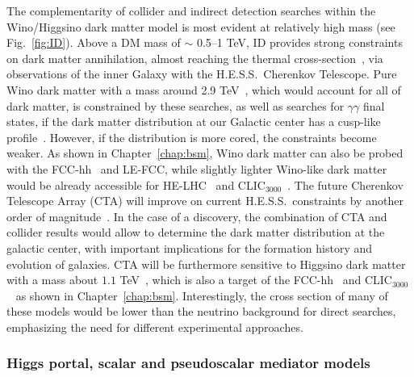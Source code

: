 \documentclass[../report.tex]{subfiles}
\begin{document}
The complementarity of collider and indirect detection searches within the Wino/Higgsino dark matter model is most evident at relatively high mass (see Fig.~\ref{fig:ID}). Above a DM mass of $\sim$ 0.5--1 TeV, ID provides strong constraints on dark matter annihilation, almost reaching the thermal cross-section~\cite{Abdallah:2016ygi}, via observations of the inner Galaxy with the H.E.S.S.~Cherenkov Telescope. Pure Wino dark matter with a mass around 2.9 TeV~\cite{Beneke:2016ync}, which would account for all of dark matter, is constrained by these searches, as well as searches for $\gamma\gamma$ final states, if the dark matter distribution at our Galactic center has a cusp-like profile~\cite{Cohen2013-ah, Cabrera-Catalan2015-os, Hryczuk2019-mv, Rinchiuso:2018ajn}.   However, if the distribution is more cored, the constraints become weaker. As shown in Chapter~\ref{chap:bsm}, Wino dark matter can also be probed with the FCC-hh~\cite{CidVidal:2018eel} and LE-FCC, while slightly lighter Wino-like dark matter would be already accessible for HE-LHC~\cite{CidVidal:2018eel} and CLIC$_{3000}$~\cite{deBlas:2018mhx}.
The future Cherenkov Telescope Array (CTA) will improve on current H.E.S.S.~constraints by another order of magnitude~\cite{Drlica-Wagner2019-nr, Carr2016-vl, Silverwood2015-ff}.  In the case of a discovery, the combination of CTA and collider results would allow to determine the dark matter distribution at the galactic center, with important implications for the formation history and evolution of galaxies.  CTA will be furthermore sensitive to Higgsino dark matter with a mass about $1.1$ TeV~\cite{Cabrera-Catalan2015-os, Krall:2017xij, Hryczuk2019-mv}, which is also a target of the FCC-hh~\cite{CidVidal:2018eel} and CLIC$_{3000}$~\cite{deBlas:2018mhx} as shown in Chapter~\ref{chap:bsm}. Interestingly, the cross section of many of these models would be lower than the neutrino background for direct searches, emphasizing the need for different experimental approaches.

\subsubsection*{Higgs portal, scalar and pseudoscalar mediator models}
\end{document}
